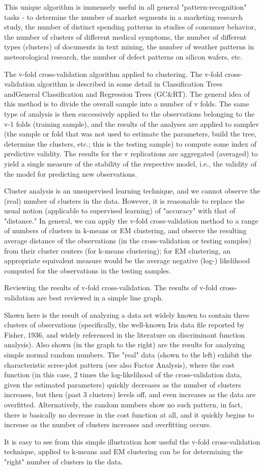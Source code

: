 This unique algorithm is immensely useful in all general "pattern-recognition" tasks - to determine the number of market segments in a marketing research study, the number of distinct spending patterns in studies of consumer behavior, the number of clusters of different medical symptoms, the number of different types (clusters) of documents in text mining, the number of weather patterns in meteorological research, the number of defect patterns on silicon wafers, etc.

The v-fold cross-validation algorithm applied to clustering. The v-fold cross-validation algorithm is described in some detail in Classification Trees andGeneral Classification and Regression Trees (GC&RT). The general idea of this method is to divide the overall sample into a number of v folds. The same type of analysis is then successively applied to the observations belonging to the v-1 folds (training sample), and the results of the analyses are applied to samplev (the sample or fold that was not used to estimate the parameters, build the tree, determine the clusters, etc.; this is the testing sample) to compute some index of predictive validity. The results for the v replications are aggregated (averaged) to yield a single measure of the stability of the respective model, i.e., the validity of the model for predicting new observations.

Cluster analysis is an unsupervised learning technique, and we cannot observe the (real) number of clusters in the data. However, it is reasonable to replace the usual notion (applicable to supervised learning) of "accuracy" with that of "distance." In general, we can apply the v-fold cross-validation method to a range of numbers of clusters in k-means or EM clustering, and observe the resulting average distance of the observations (in the cross-validation or testing samples) from their cluster centers (for k-means clustering); for EM clustering, an appropriate equivalent measure would be the average negative (log-) likelihood computed for the observations in the testing samples.

Reviewing the results of v-fold cross-validation. The results of v-fold cross-validation are best reviewed in a simple line graph.



Shown here is the result of analyzing a data set widely known to contain three clusters of observations (specifically, the well-known Iris data file reported by Fisher, 1936, and widely referenced in the literature on discriminant function analysis). Also shown (in the graph to the right) are the results for analyzing simple normal random numbers. The "real" data (shown to the left) exhibit the characteristic scree-plot pattern (see also Factor Analysis), where the cost function (in this case, 2 times the log-likelihood of the cross-validation data, given the estimated parameters) quickly decreases as the number of clusters increases, but then (past 3 clusters) levels off, and even increases as the data are overfitted. Alternatively, the random numbers show no such pattern, in fact, there is basically no decrease in the cost function at all, and it quickly begins to increase as the number of clusters increases and overfitting occurs.

It is easy to see from this simple illustration how useful the v-fold cross-validation technique, applied to k-means and EM clustering can be for determining the "right" number of clusters in the data.

